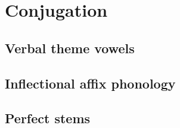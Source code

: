 \chapter{Conjugation}
\label{conjugation}

\section{Verbal theme vowels}

\section{Inflectional affix phonology}

\section{Perfect stems}
